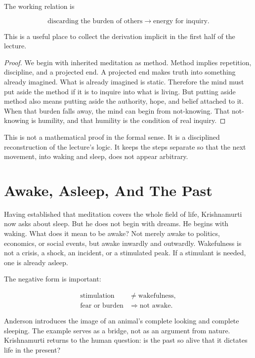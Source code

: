 The working relation is

\begin{equation}
\text{discarding the burden of others}
\longrightarrow
\text{energy for inquiry}.
\end{equation}

This is a useful place to collect the derivation implicit in the first half of the lecture.

\begin{proof}
We begin with inherited meditation as method. Method implies repetition, discipline, and a projected end. A projected end makes truth into something already imagined. What is already imagined is static. Therefore the mind must put aside the method if it is to inquire into what is living. But putting aside method also means putting aside the authority, hope, and belief attached to it. When that burden falls away, the mind can begin from not-knowing. That not-knowing is humility, and that humility is the condition of real inquiry.
\end{proof}

This is not a mathematical proof in the formal sense. It is a disciplined reconstruction of the lecture's logic. It keeps the steps separate so that the next movement, into waking and sleep, does not appear arbitrary.

\section{Awake, Asleep, And The Past}

Having established that meditation covers the whole field of life, Krishnamurti now asks about sleep. But he does not begin with dreams. He begins with waking. What does it mean to be awake? Not merely awake to politics, economics, or social events, but awake inwardly and outwardly. Wakefulness is not a crisis, a shock, an incident, or a stimulated peak. If a stimulant is needed, one is already asleep.

The negative form is important:

\begin{align}
\text{stimulation} &\neq \text{wakefulness},\\
\text{fear or burden} &\Rightarrow \text{not awake}.
\end{align}

Anderson introduces the image of an animal's complete looking and complete sleeping. The example serves as a bridge, not as an argument from nature. Krishnamurti returns to the human question: is the past so alive that it dictates life in the present?

